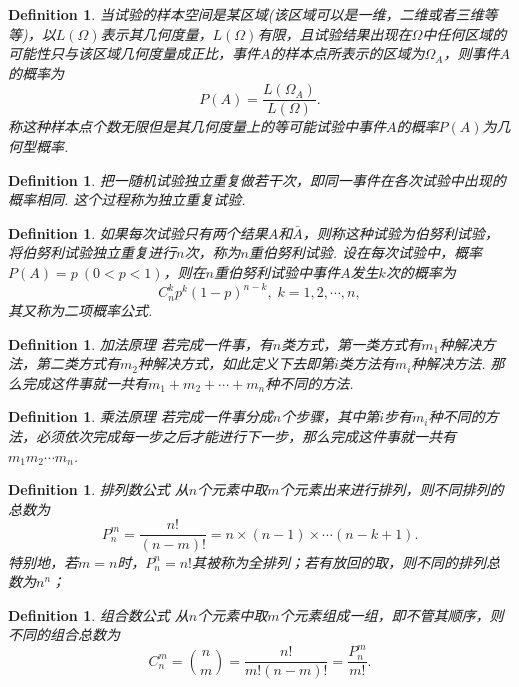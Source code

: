 \documentclass{article}
\newtheorem{definition}[theorem]{Definition}
\begin{document}
\begin{definition}
\rm 当试验的样本空间是某区域(该区域可以是一维，二维或者三维等等)，以$L(\Omega)$表示其几何度量，$L(\Omega)$有限，{\color{red}且试验结果出现在$\Omega$中任何区域的可能性只与该区域几何度量成正比}，事件$A$的样本点所表示的区域为$\Omega_A$，则事件$A$的概率为
$$
P(A) = \frac{L(\Omega_A)}{L(\Omega)}.
$$
称这种样本点个数无限但是其几何度量上的等可能试验中事件$A$的概率$P(A)$为{\color{red}几何型概率}.
\end{definition}

\begin{definition}
\rm 把一随机试验独立重复做若干次，即同一事件在各次试验中出现的概率相同. 这个过程称为{\color{red}独立重复试验}.
\end{definition}

\begin{definition}
\rm 如果每次试验只有两个结果$A$和$\bar{A}$，则称这种试验为{\color{red}伯努利试验}，将伯努利试验独立重复进行$n$次，称为{\color{red}$n$重伯努利试验}. 设在每次试验中，概率$P(A)=p~(0<p<1)$，则在$n$重伯努利试验中事件$A$发生$k$次的概率为
$$
C_n^kp^k(1-p)^{n-k},\; k=1,2,\cdots,n,
$$
其又称为{\color{red}二项概率公式}.
\end{definition}

\begin{definition}
\rm {\color{red} 加法原理} 若完成一件事，有$n$类方式，第一类方式有$m_1$种解决方法，第二类方式有$m_2$种解决方式，如此定义下去即第$i$类方法有$m_i$种解决方法. 那么完成这件事就一共有$m_1 + m_2 + \cdots + m_n$种不同的方法. 
\end{definition}

\begin{definition}
\rm {\color{red} 乘法原理} 若完成一件事分成$n$个步骤，其中第$i$步有$m_i$种不同的方法，必须依次完成每一步之后才能进行下一步，那么完成这件事就一共有$m_1m_2\cdots m_n$.
\end{definition}


\begin{definition}
\rm {\color{red} 排列数公式} 从$n$个元素中取$m$个元素出来进行排列，则不同排列的总数为
$$
P^m_n = \frac{n!}{(n-m)!} = n\times(n-1)\times\cdots(n-k+1).
$$
特别地，若$m=n$时，$P^n_n = n!$其被称为{\color{red}全排列}；若有放回的取，则不同的排列总数为$n^n$；
\end{definition}

\begin{definition}
\rm {\color{red} 组合数公式} 从$n$个元素中取$m$个元素组成一组，即不管其顺序，则不同的组合总数为
$$
C^m_n = \binom nm  = \frac{n!}{m!(n-m)!} = \frac{P^m_n}{m!}. 
$$
\end{definition}
\end{document}
